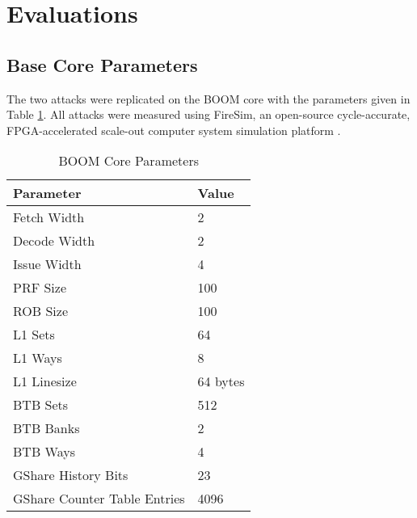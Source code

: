 \section{Evaluations} \label{Evaluations}

\subsection{Base Core Parameters}

The two attacks were replicated on the BOOM core with the parameters given
in Table \ref{tab:boom-core-params}. All attacks were measured using FireSim, an open-source
cycle-accurate, FPGA-accelerated scale-out computer system simulation platform \cite{b12}.

\begin{table}
\centering \caption{BOOM Core Parameters} \label{tab:boom-core-params}
\begin{tabular}{@{} *2l @{}} \toprule
    Parameter                    & Value \\ \midrule
    Fetch Width                  & 2 \\
    Decode Width                 & 2 \\
    Issue Width                  & 4 \\
    PRF Size                     & 100 \\
    ROB Size                     & 100 \\ \midrule
    L1 Sets                      & 64 \\
    L1 Ways                      & 8 \\
    L1 Linesize                  & 64 bytes \\ \midrule
    BTB Sets                     & 512 \\
    BTB Banks                    & 2 \\
    BTB Ways                     & 4 \\ \midrule
    GShare History Bits          & 23 \\
    GShare Counter Table Entries & 4096 \\ \bottomrule
\end{tabular}
\end{table}

